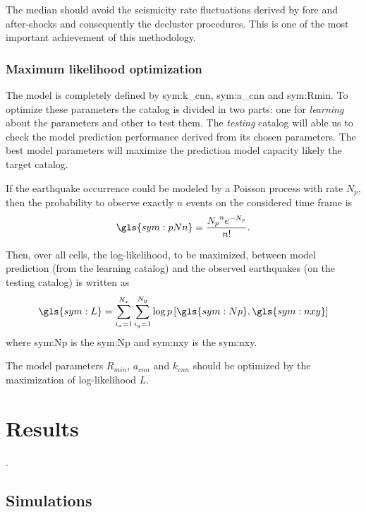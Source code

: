 \documentclass[grl]{agutex}
\begin{document}
\begin{article}
The median should avoid the seismicity rate fluctuations derived by fore and after-shocks and consequently the decluster procedures. This is one of the most important achievement of this methodology.


\subsubsection{Maximum likelihood optimization}

The model is completely defined by \gls{sym:k_cnn}, \gls{sym:a_cnn} and \gls{sym:Rmin}. To optimize these parameters the catalog is divided in two parts: one for \emph{learning} about the parameters and other to test them. The \emph{testing} catalog will able us to check the model prediction performance derived from its chosen parameters. The best model parameters will maximize the prediction model capacity likely the target catalog.

If the earthquake occurrence could be modeled by a Poisson process with rate $N_p$, then the probability to observe exactly $n$ events on the considered time frame is
\begin{equation}
	\ensuremath{
		\gls{sym:pNn} = \frac{{N_p}^n e^{-N_p}}{n!}.
	}
	\label{eq:poisson_probability}
\end{equation}

Then, over all cells, the log-likelihood, to be maximized, between model prediction (from the learning catalog) and the observed earthquakes (on the testing catalog) is written as
\begin{equation}
	\ensuremath{
		\gls{sym:L} = \sum_{i_x=1}^{N_x}\sum_{i_y=1}^{N_y}\log p\left[  \gls{sym:Np}, \gls{sym:nxy}  \right]
	}
	\label{eq:loglik}
\end{equation}
where \gls{sym:Np} is the \glsdesc{sym:Np} and
	  \gls{sym:nxy} is the \glsdesc{sym:nxy}.

The model parameters $R_{min}$, $a_{cnn}$ and $k_{cnn}$ should be optimized by the maximization of log-likelihood $L$.



\section{Results}

.

\subsection{Simulations}


\end{article}
\end{document}
